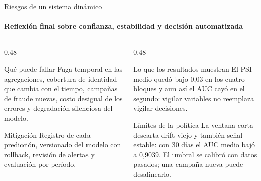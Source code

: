 \documentclass[aspectratio=169,11pt]{beamer}
\begin{document}
\begin{frame}{Riesgos de un sistema dinámico}
  \framesubtitle{Reflexión final sobre confianza, estabilidad y decisión automatizada}
  \begin{columns}[T]
    \begin{column}{0.48\textwidth}
      \begin{block}{Qué puede fallar}
        \small Fuga temporal en las agregaciones, cobertura de identidad que cambia con el tiempo, campañas de fraude nuevas, costo desigual de los errores y degradación silenciosa del modelo.
      \end{block}
      \begin{block}{Mitigación}
        \small Registro de cada predicción, versionado del modelo con rollback, revisión de alertas y evaluación por período.
      \end{block}
    \end{column}
    \begin{column}{0.48\textwidth}
      \begin{alertblock}{Lo que los resultados muestran}
        \small El PSI medio quedó bajo 0,03 en los cuatro bloques y aun así el AUC cayó en el segundo: vigilar variables no reemplaza vigilar decisiones.
      \end{alertblock}
      \begin{block}{Límites de la política}
        \small La ventana corta descarta drift viejo y también señal estable: con 30 días el AUC medio bajó a 0,9039. El umbral se calibró con datos pasados; una campaña nueva puede desalinearlo.
      \end{block}
    \end{column}
  \end{columns}
\end{frame}
\end{document}
